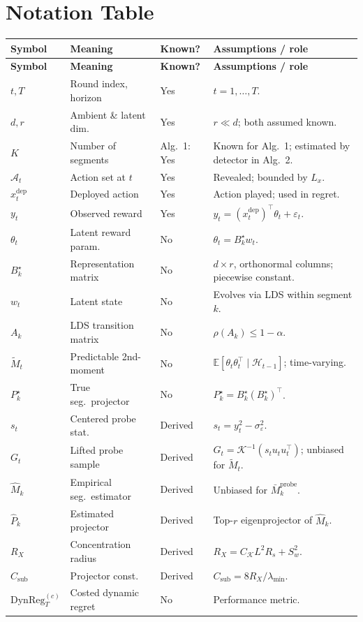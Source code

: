 \documentclass{article}
\newcommand{\E}{\mathbb{E}}
\newcommand{\cA}{\mathcal{A}}
\newcommand{\cH}{\mathcal{H}}
\newcommand{\DynReg}{\mathrm{DynReg}}
\begin{document}
\section{Notation Table}
\label{app:notation}

\footnotesize
\setlength{\tabcolsep}{4pt}
\renewcommand{\arraystretch}{1.3}

\begin{longtable}{@{}p{} p{} p{} p{}@{}}
\toprule
\textbf{Symbol} & \textbf{Meaning} & \textbf{Known?} & \textbf{Assumptions / role} \\
\midrule
\endfirsthead
\toprule
\textbf{Symbol} & \textbf{Meaning} & \textbf{Known?} & \textbf{Assumptions / role} \\
\midrule
\endhead
\bottomrule
\endfoot
$t, T$ & Round index, horizon & Yes & $t=1,\dots,T$. \\
$d, r$ & Ambient \& latent dim. & Yes & $r\ll d$; both assumed known. \\
$K$ & Number of segments & Alg.~1: Yes & Known for Alg.~1; estimated by detector in Alg.~2. \\
$\cA_t$ & Action set at $t$ & Yes & Revealed; bounded by $L_x$. \\
$x_t^{\mathrm{dep}}$ & Deployed action & Yes & Action played; used in regret. \\
$y_t$ & Observed reward & Yes & $y_t=(x_t^{\mathrm{dep}})^\top\theta_t+\varepsilon_t$. \\
$\theta_t$ & Latent reward param. & No & $\theta_t = B_k^\star w_t$. \\
$B_k^\star$ & Representation matrix & No & $d\times r$, orthonormal columns; piecewise constant. \\
$w_t$ & Latent state & No & Evolves via LDS within segment $k$. \\
$A_k$ & LDS transition matrix & No & $\rho(A_k)\le 1-\alpha$. \\
$\widetilde M_t$ & Predictable 2nd-moment & No & $\E[\theta_t\theta_t^\top\mid\cH_{t-1}]$; time-varying. \\
$P_k^\star$ & True seg.\ projector & No & $P_k^\star=B_k^\star(B_k^\star)^\top$. \\
$s_t$ & Centered probe stat. & Derived & $s_t=y_t^2-\sigma_\varepsilon^2$. \\
$G_t$ & Lifted probe sample & Derived & $G_t=\mathcal K^{-1}(s_tu_tu_t^\top)$; unbiased for $\widetilde M_t$. \\
$\widehat M_k$ & Empirical seg.\ estimator & Derived & Unbiased for $\bar M_k^{\mathrm{probe}}$. \\
$\widehat P_k$ & Estimated projector & Derived & Top-$r$ eigenprojector of $\widehat M_k$. \\
$R_X$ & Concentration radius & Derived & $R_X=C_{\mathcal K}L^2R_s+S_w^2$. \\
$C_{\mathrm{sub}}$ & Projector const. & Derived & $C_{\mathrm{sub}}=8R_X/\lambda_{\min}$. \\
$\DynReg_T^{(c)}$ & Costed dynamic regret & No & Performance metric. \\
\end{longtable}
\end{document}
